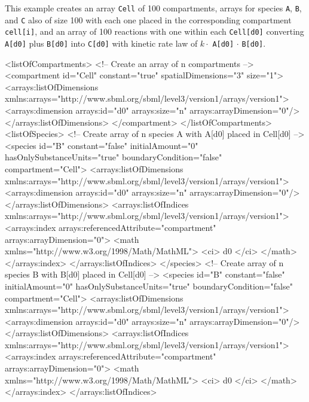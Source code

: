 This example creates an array {\tt Cell} of 100 compartments, arrays for species {\tt A}, {\tt B}, and {\tt C} also of size 100 with each one placed in the corresponding compartment {\tt cell[i]}, and an array of 100 reactions with one within each {\tt Cell[d0]} converting {\tt A[d0]} plus {\tt B[d0]} into {\tt C[d0]} with kinetic rate law of $k \cdot$ {\tt A[d0]} $\cdot$ {\tt B[d0]}.

\begin{example}
<listOfCompartments>
    <!-- Create an array of n compartments -->
    <compartment id="Cell" constant="true" spatialDimensions="3" size="1">
        <arrays:listOfDimensions
            xmlns:arrays="http://www.sbml.org/sbml/level3/version1/arrays/version1">
            <arrays:dimension arrays:id="d0" arrays:size="n" arrays:arrayDimension="0"/>
        </arrays:listOfDimensions>
    </compartment>
</listOfCompartments>
<listOfSpecies>
     <!-- Create array of n species A with A[d0] placed in Cell[d0] -->
    <species id="B" constant="false" initialAmount="0" hasOnlySubstanceUnits="true"
	 boundaryCondition="false" compartment="Cell">
        <arrays:listOfDimensions
            xmlns:arrays="http://www.sbml.org/sbml/level3/version1/arrays/version1">
            <arrays:dimension arrays:id="d0" arrays:size="n" arrays:arrayDimension="0"/>
        </arrays:listOfDimensions>
        <arrays:listOfIndices
            xmlns:arrays="http://www.sbml.org/sbml/level3/version1/arrays/version1">
            <arrays:index arrays:referencedAttribute="compartment" arrays:arrayDimension="0">
                <math xmlns="http://www.w3.org/1998/Math/MathML">
                    <ci> d0 </ci>
                </math>
            </arrays:index>
        </arrays:listOfIndices>
    </species>
    <!-- Create array of n species B with B[d0] placed in Cell[d0] -->
    <species id="B" constant="false" initialAmount="0" hasOnlySubstanceUnits="true"
	 boundaryCondition="false" compartment="Cell">
        <arrays:listOfDimensions
            xmlns:arrays="http://www.sbml.org/sbml/level3/version1/arrays/version1">
            <arrays:dimension arrays:id="d0" arrays:size="n" arrays:arrayDimension="0"/>
        </arrays:listOfDimensions>
        <arrays:listOfIndices
            xmlns:arrays="http://www.sbml.org/sbml/level3/version1/arrays/version1">
            <arrays:index arrays:referencedAttribute="compartment" arrays:arrayDimension="0">
                <math xmlns="http://www.w3.org/1998/Math/MathML">
                    <ci> d0 </ci>
                </math>
            </arrays:index>
        </arrays:listOfIndices>

\end{example}
